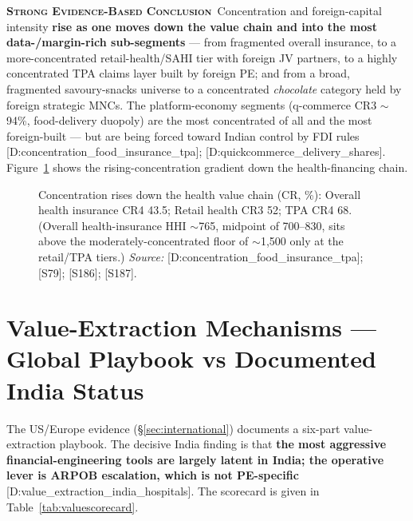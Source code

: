 \documentclass[11pt,a4paper]{article}
\newcommand{\SE}{\textcolor{secol}{\textsc{\textbf{Strong Evidence-Based Conclusion}}}}
\newcommand{\cs}[1]{\textnormal{[#1]}}
\begin{document}
\SE\ Concentration and foreign-capital intensity \textbf{rise as one moves down the value chain and into the most data-/margin-rich sub-segments} --- from fragmented overall insurance, to a more-concentrated retail-health/SAHI tier with foreign JV partners, to a highly concentrated TPA claims layer built by foreign PE; and from a broad, fragmented savoury-snacks universe to a concentrated \emph{chocolate} category held by foreign strategic MNCs. The platform-economy segments (q-commerce CR3 $\sim$94\%, food-delivery duopoly) are the most concentrated of all and the most foreign-built --- but are being forced toward Indian control by FDI rules \cs{D:concentration\_food\_insurance\_tpa}; \cs{D:quickcommerce\_delivery\_shares}. Figure~\ref{fig:ch4chain} shows the rising-concentration gradient down the health-financing chain.

\begin{figure}[htbp]
\centering
{}
\caption{Concentration rises down the health value chain (CR, \%): Overall health insurance CR4 43.5; Retail health CR3 52; TPA CR4 68. (Overall health-insurance HHI $\sim$765, midpoint of 700--830, sits above the moderately-concentrated floor of $\sim$1{,}500 only at the retail/TPA tiers.) \textit{Source:} \cs{D:concentration\_food\_insurance\_tpa}; \cs{S79}; \cs{S186}; \cs{S187}.}
\label{fig:ch4chain}
\end{figure}

\section{Value-Extraction Mechanisms --- Global Playbook vs Documented India Status}\label{sec:valueextraction}
The US/Europe evidence (\S\ref{sec:international}) documents a six-part value-extraction playbook. The decisive India finding is that \textbf{the most aggressive financial-engineering tools are largely latent in India; the operative lever is ARPOB escalation, which is not PE-specific} \cs{D:value\_extraction\_india\_hospitals}. The scorecard is given in Table~\ref{tab:valuescorecard}.
\end{document}
